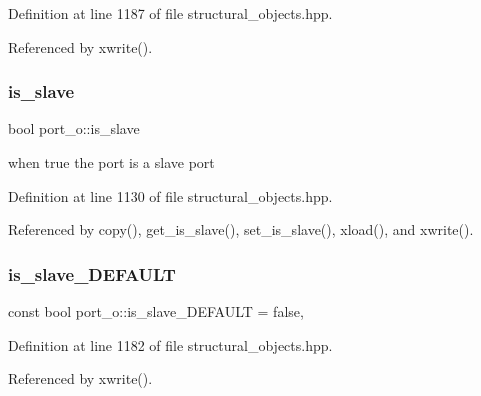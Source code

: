 Definition at line 1187 of file structural\+\_\+objects.\+hpp.



Referenced by xwrite().

\mbox{\label{structport__o_a1c5059759ad09f147afde1984c86a1b8}} 
\subsubsection{\texorpdfstring{is\+\_\+slave}{is\_slave}}
{\footnotesize\ttfamily bool port\+\_\+o\+::is\+\_\+slave\hspace{0.3cm}{\ttfamily [private]}}



when true the port is a slave port 



Definition at line 1130 of file structural\+\_\+objects.\+hpp.



Referenced by copy(), get\+\_\+is\+\_\+slave(), set\+\_\+is\+\_\+slave(), xload(), and xwrite().

\mbox{\label{structport__o_a6dde83fa52a709bcac55481900d2d889}} 
\subsubsection{\texorpdfstring{is\+\_\+slave\+\_\+\+D\+E\+F\+A\+U\+LT}{is\_slave\_DEFAULT}}
{\footnotesize\ttfamily const bool port\+\_\+o\+::is\+\_\+slave\+\_\+\+D\+E\+F\+A\+U\+LT = false\hspace{0.3cm}{\ttfamily [static]}, {\ttfamily [private]}}



Definition at line 1182 of file structural\+\_\+objects.\+hpp.



Referenced by xwrite().

\mbox{\label{structport__o_a2668f6655348ed977814dd8a3da28ac0}} 
